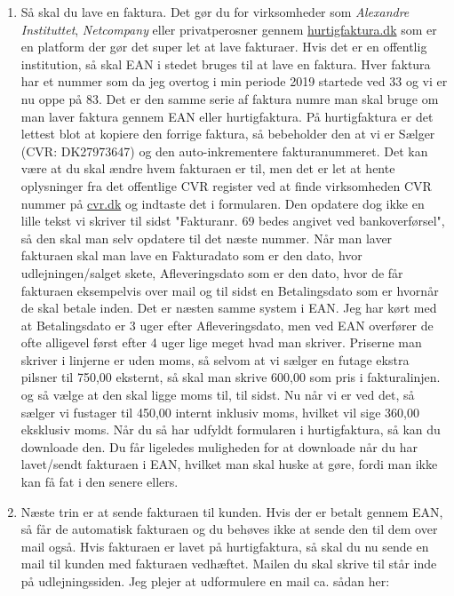 \begin{enumerate}
    \item Så skal du lave en faktura. Det gør du for virksomheder som \textit{Alexandre Instituttet}, \textit{Netcompany} eller privatperosner gennem \href{https://www.hurtigfaktura.dk/}{hurtigfaktura.dk} som er en platform der gør det super let at lave fakturaer. Hvis det er en offentlig institution, så skal EAN i stedet bruges til at lave en faktura. Hver faktura har et nummer som da jeg overtog i min periode 2019 startede ved 33 og vi er nu oppe på 83. Det er den samme serie af faktura numre man skal bruge om man laver faktura gennem EAN eller hurtigfaktura. På hurtigfaktura er det lettest blot at kopiere den forrige faktura, så bebeholder den at vi er Sælger (CVR: DK27973647) og den auto-inkrementere fakturanummeret. Det kan være at du skal ændre hvem fakturaen er til, men det er let at hente oplysninger fra det offentlige CVR register ved at finde virksomheden CVR nummer på \href{https://cvr.dk}{cvr.dk} og indtaste det i formularen. Den opdatere dog ikke en lille tekst vi skriver til sidst "Fakturanr. 69 bedes angivet ved bankoverførsel", så den skal man selv opdatere til det næste nummer. Når man laver fakturaen skal man lave en Fakturadato som er den dato, hvor udlejningen/salget skete, Afleveringsdato som er den dato, hvor de får fakturaen eksempelvis over mail og til sidst en Betalingsdato som er hvornår de skal betale inden. Det er næsten samme system i EAN. Jeg har kørt med at Betalingsdato er 3 uger efter Afleveringsdato, men ved EAN overfører de ofte alligevel først efter 4 uger lige meget hvad man skriver. Priserne man skriver i linjerne er uden moms, så selvom at vi sælger en futage ekstra pilsner til 750,00 eksternt, så skal man skrive 600,00 som pris i fakturalinjen. og så vælge at den skal ligge moms til, til sidst. Nu når vi er ved det, så sælger vi fustager til 450,00 internt inklusiv moms, hvilket vil sige 360,00 eksklusiv moms. Når du så har udfyldt formularen i hurtigfaktura, så kan du downloade den. Du får ligeledes muligheden for at downloade når du har lavet/sendt fakturaen i EAN, hvilket man skal huske at gøre, fordi man ikke kan få fat i den senere ellers.
    \item Næste trin er at sende fakturaen til kunden. Hvis der er betalt gennem EAN, så får de automatisk fakturaen og du behøves ikke at sende den til dem over mail også. Hvis fakturaen er lavet på hurtigfaktura, så skal du nu sende en mail til kunden med fakturaen vedhæftet. Mailen du skal skrive til står inde på udlejningssiden. Jeg plejer at udformulere en mail ca. sådan her:\\

\end{enumerate}

